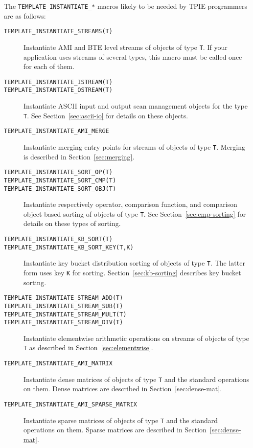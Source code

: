 The {\tt TEMPLATE\_INSTANTIATE\_*} macros likely to be needed by TPIE
programmers are as follows:
\begin{description}
\item[{\tt TEMPLATE\_INSTANTIATE\_STREAMS(T)}] Instantiate AMI and
  BTE level streams of objects of type {\tt T}.  If your
  application uses streams of several types, this macro must be called
  once for each of them.
\item[{\tt TEMPLATE\_INSTANTIATE\_ISTREAM(T)}]
\item[{\tt TEMPLATE\_INSTANTIATE\_OSTREAM(T)}] Instantiate ASCII
  input and output scan management objects for the type {\tt T}.
  See Section~\ref{sec:ascii-io} for details on these objects.
\item[{\tt TEMPLATE\_INSTANTIATE\_AMI\_MERGE}] Instantiate merging entry
  points for streams of objects of type {\tt T}.  Merging is described
  in Section~\ref{sec:merging}.
\item[{\tt TEMPLATE\_INSTANTIATE\_SORT\_OP(T)}]
\item[{\tt TEMPLATE\_INSTANTIATE\_SORT\_CMP(T)}]
\item[{\tt TEMPLATE\_INSTANTIATE\_SORT\_OBJ(T)}] Instantiate
  respectively operator, comparison function, and comparison object
  based sorting of objects of type {\tt T}.  See
  Section~\ref{sec:cmp-sorting} for details on these types of sorting.
\item[{\tt TEMPLATE\_INSTANTIATE\_KB\_SORT(T)}] 
\item[{\tt TEMPLATE\_INSTANTIATE\_KB\_SORT\_KEY(T,K)}] Instantiate key
  bucket distribution sorting of objects of type {\tt T}.  The latter
  form uses key {\tt K} for sorting.  Section~\ref{sec:kb-sorting}
  describes key bucket sorting.
\item[{\tt TEMPLATE\_INSTANTIATE\_STREAM\_ADD(T)}]
\item[{\tt TEMPLATE\_INSTANTIATE\_STREAM\_SUB(T)}]
\item[{\tt TEMPLATE\_INSTANTIATE\_STREAM\_MULT(T)}]
\item[{\tt TEMPLATE\_INSTANTIATE\_STREAM\_DIV(T)}]
  Instantiate elementwise arithmetic operations on streams of objects
  of type {\tt T} as described in Section~\ref{sec:elementwise}.
\item[{\tt TEMPLATE\_INSTANTIATE\_AMI\_MATRIX}]
  Instantiate dense matrices of objects of type {\tt T} and the
  standard operations on them.  Dense
  matrices are described in
  Section~\ref{sec:dense-mat}.
\item[{\tt TEMPLATE\_INSTANTIATE\_AMI\_SPARSE\_MATRIX}]
  Instantiate sparse matrices of objects of type {\tt T} and the
  standard operations on them.  Sparse
  matrices are described in
  Section~\ref{sec:dense-mat}.
\end{description}

